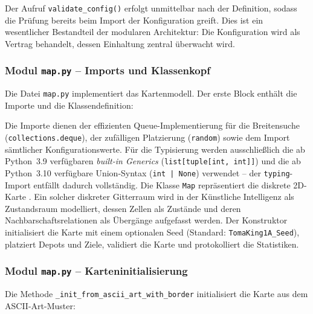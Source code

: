 Der Aufruf \texttt{validate\_config()} erfolgt unmittelbar nach der Definition, sodass die Prüfung bereits beim Import der Konfiguration greift. Dies ist ein wesentlicher Bestandteil der modularen Architektur: Die Konfiguration wird als Vertrag behandelt, dessen Einhaltung zentral überwacht wird.


\subsubsection{Modul \texttt{map.py} – Imports und Klassenkopf}

Die Datei \texttt{map.py} implementiert das Kartenmodell. Der erste Block enthält die Importe und die Klassendefinition:



Die Importe dienen der effizienten Queue-Implementierung für die Breitensuche (\texttt{collections.deque}), der zufälligen Platzierung (\texttt{random}) sowie dem Import sämtlicher Konfigurationswerte. Für die Typisierung werden ausschließlich die ab Python~3.9 verfügbaren \textit{built-in Generics} (\texttt{list[tuple[int, int]]}) und die ab Python~3.10 verfügbare Union-Syntax (\texttt{int | None}) verwendet – der \texttt{typing}-Import entfällt dadurch vollständig. Die Klasse \texttt{Map} repräsentiert die diskrete \acs{2D}-Karte \cite[S. 14\,f.]{5}. Ein solcher diskreter Gitterraum wird in der Künstliche Intelligenz als Zustandsraum modelliert, dessen Zellen als Zustände und deren Nachbarschaftsrelationen als Übergänge aufgefasst werden. Der Konstruktor initialisiert die Karte mit einem optionalen Seed (Standard: \texttt{TomaKing1A\_Seed}), platziert Depots und Ziele, validiert die Karte und protokolliert die Statistiken.


\subsubsection{Modul \texttt{map.py} – Karteninitialisierung}

Die Methode \texttt{\_init\_from\_ascii\_art\_with\_border} initialisiert die Karte aus dem \acs{ASCII}-Art-Muster:


